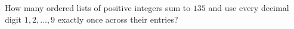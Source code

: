 How many ordered lists of positive integers sum to $ 135 $ and use every decimal digit $ 1,2,\ldots,9 $ exactly once across their entries?
